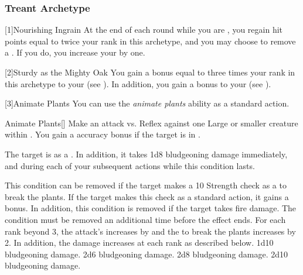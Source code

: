         \subsubsection{Treant Archetype}

            [1]{Nourishing Ingrain} At the end of each round while you are , you regain hit points equal to twice your rank in this archetype, and you may choose to remove a .
            If you do, you increase your  by one.

            [2]{Sturdy as the Mighty Oak} You gain a bonus equal to three times your rank in this archetype to your  (see ).
            In addition, you gain a  bonus to your  (see ).

            [3]{Animate Plants} You can use the \textit{animate plants} ability as a standard action.
            \begin{activeability}{Animate Plants}[]
                \rankline
                Make an attack vs. Reflex against one Large or smaller  creature within \medrange.
                You gain a  accuracy bonus if the target is in .

                \hit The target is \slowed as a .
                In addition, it takes 1d8 bludgeoning damage immediately, and during each of your subsequent actions while this condition lasts.

                This condition can be removed if the target makes a  10 Strength check as a  to break the plants.
                If the target makes this check as a standard action, it gains a  bonus.
                In addition, this condition is removed if the target takes fire damage.
                \crit The condition must be removed an additional time before the effect ends.
                \rankline
                For each rank beyond 3, the attack's  increases by  and the  to break the plants increases by 2.
                In addition, the damage increases at each rank as described below.
                 1d10 bludgeoning damage.
                 2d6 bludgeoning damage.
                 2d8 bludgeoning damage.
                 2d10 bludgeoning damage.
            \end{activeability}


